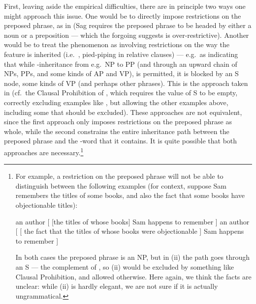 \documentclass[output=paper
 	        ,biblatex
                ,babelshorthands
                ,newtxmath
                ,draftmode
                ,colorlinks, citecolor=brown
]{langscibook}
\begin{document}
First, leaving aside the empirical difficulties, there are in principle two ways one might
approach this issue. One would be to directly impose restrictions on the preposed phrase,
as in \cite[455]{Sag:97} (Sag requires the preposed phrase to be headed by either a noun
or a preposition --- which the forgoing suggests is over-restrictive). Another would be to
treat the phenomenon as involving restrictions on the way the  feature is
inherited (i.e.\ , pied-piping in relative clauses) --- e.g.\ as
indicating that while -inheritance from e.g.\ NP to PP (and through an upward
chain of NPs, PPs, and some kinds of AP and VP), is permitted, it is blocked by an S node,
some kinds of VP (and perhaps other phrases).  This is the approach taken in \cite{Pollard:Sag:94} (cf.\
the Clausal  Prohibition of \citealt[220]{Pollard:Sag:94}, which requires the
\feat{rel} value of S to be empty, correctly excluding examples like \pref{x:rc-28}, but
allowing the other examples above, including some that should be excluded). These
approaches are not equivalent, since the first approach only imposes restrictions on the
preposed phrase as whole, while the second constrains the entire inheritance path between
the preposed phrase and the \lic{wh}-word that it contains. It is quite possible that both
approaches are necessary.\footnote{For example, a restriction on the preposed phrase will
  not be able to distinguish between the following examples (for context, suppose Sam
  remembers the titles of some books, and also the fact that some books have objectionable
  titles):
  \begin{exe}
    \ex an author [ [the titles of whose books] Sam happens to remember \trace ]
    \ex an author [ [ the fact that the titles of whose books were objectionable ]  Sam happens to remember \trace ]
  \end{exe}
  In both cases the preposed phrase is an NP, but in (ii) the \isi{relative
    inheritance} path goes through an S --- the complement of \lic{fact}, so (ii) would be
  excluded by something like Clausal \feat{rel} Prohibition, and allowed otherwise. Here
  again, we think the facts are unclear: while (ii) is hardly elegant, we are not sure if
  it is actually ungrammatical.}
\end{document}

